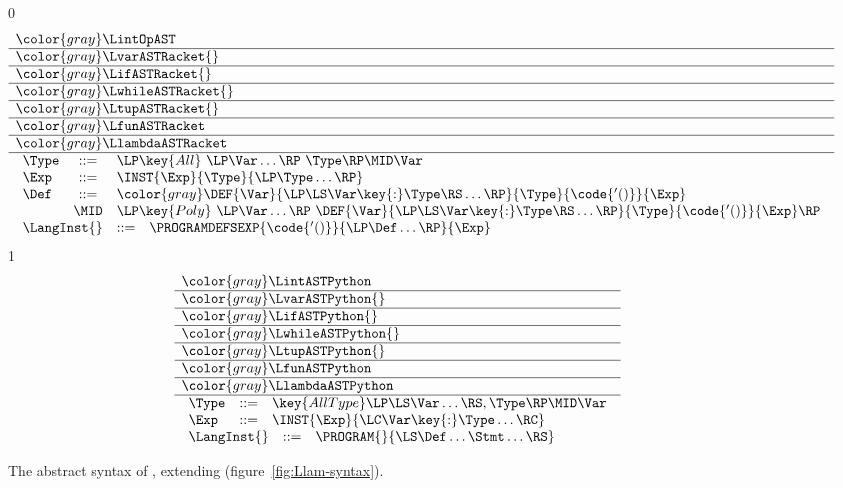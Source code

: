 \documentclass[7x10]{TimesAPriori_MIT}%
\newcommand{\gray}[1]{{\color{gray} #1}}
\def\racketEd{0}
\def\pythonEd{1}
\def\edition{1}
\newcommand{\pythonColor}[0]{}
\numberwithin{theorem}{chapter}
\numberwithin{definition}{chapter}
\numberwithin{equation}{chapter}
\begin{document}
\newcommand{\LinstASTRacket}{
\begin{array}{lcl}
  \Type &::=& \LP\key{All}~\LP\Var\ldots\RP~ \Type\RP \MID \Var \\
  \Exp &::=& \INST{\Exp}{\Type}{\LP\Type\ldots\RP} \\
  \Def &::=& \gray{ \DEF{\Var}{\LP\LS\Var \key{:} \Type\RS \ldots\RP}{\Type}{\code{'()}}{\Exp} } \\
   &\MID& \LP\key{Poly}~\LP\Var\ldots\RP~ \DEF{\Var}{\LP\LS\Var \key{:} \Type\RS \ldots\RP}{\Type}{\code{'()}}{\Exp}\RP 
\end{array}
}  

\newcommand{\LinstASTPython}{
\begin{array}{lcl}
  \Type &::=& \key{AllType}\LP\LS\Var\ldots\RS, \Type\RP \MID \Var \\
  \Exp &::=& \INST{\Exp}{\LC\Var\key{:}\Type\ldots\RC} 
\end{array}
}

\begin{figure}[tp]
\centering
\begin{tcolorbox}[colback=white]
\small
{\if\edition\racketEd
\[
\begin{array}{l}
  \gray{\LintOpAST} \\ \hline
  \gray{\LvarASTRacket{}} \\ \hline
  \gray{\LifASTRacket{}} \\ \hline
  \gray{\LwhileASTRacket{}} \\ \hline
  \gray{\LtupASTRacket{}} \\ \hline
  \gray{\LfunASTRacket} \\ \hline
  \gray{\LlambdaASTRacket} \\ \hline
  \LinstASTRacket \\
\begin{array}{lcl}
  \LangInst{} &::=& \PROGRAMDEFSEXP{\code{'()}}{\LP\Def\ldots\RP}{\Exp}
\end{array}
\end{array}
\]
\fi}
{\if\edition\pythonEd\pythonColor
\[
\begin{array}{l}
  \gray{\LintASTPython} \\ \hline
  \gray{\LvarASTPython{}} \\ \hline
  \gray{\LifASTPython{}} \\ \hline
  \gray{\LwhileASTPython{}} \\ \hline
  \gray{\LtupASTPython{}} \\ \hline
  \gray{\LfunASTPython} \\ \hline
  \gray{\LlambdaASTPython} \\ \hline
  \LinstASTPython \\
  \begin{array}{lcl}
  \LangInst{} &::=& \PROGRAM{}{\LS \Def \ldots \Stmt \ldots \RS}
  \end{array}
\end{array}
\]
\fi}
\end{tcolorbox}

\caption{The abstract syntax of \LangInst{}, extending \LangLam{}
    (figure~\ref{fig:Llam-syntax}).}
\label{fig:Lpoly-prime-syntax}
\end{figure}
\end{document}
